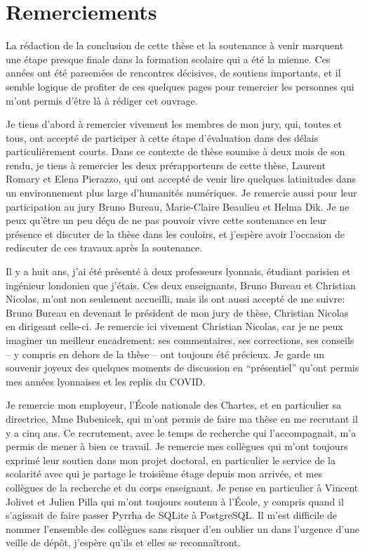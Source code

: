 \chapter*{Remerciements}

La rédaction de la conclusion de cette thèse et la soutenance à venir marquent une étape presque finale dans la formation scolaire qui a été la mienne. Ces années ont été parsemées de rencontres décisives, de soutiens importants, et il semble logique de profiter de ces quelques pages pour remercier les personnes qui m'ont permis d'être là à rédiger cet ouvrage. 

Je tiens d'abord à remercier vivement les membres de mon jury, qui, toutes et tous, ont accepté de participer à cette étape d'évaluation dans des délais particulièrement courts. Dans ce contexte de thèse soumise à deux mois de son rendu, je tiens à remercier les deux prérapporteurs de cette thèse, Laurent Romary et Elena Pierazzo, qui ont accepté de venir lire quelques latinitudes dans un environnement plus large d'humanités numériques. Je remercie aussi pour leur participation au jury Bruno Bureau, Marie-Claire Beaulieu et Helma Dik. Je ne peux qu'être un peu déçu de ne pas pouvoir vivre cette soutenance en leur présence et discuter de la thèse dans les couloirs, et j'espère avoir l'occasion de rediscuter de ces travaux après la soutenance.

Il y a huit ans, j'ai été présenté à deux professeurs lyonnais, étudiant parisien et ingénieur londonien que j'étais. Ces deux enseignants, Bruno Bureau et Christian Nicolas, m'ont non seulement accueilli, mais ils ont aussi accepté de me suivre: Bruno Bureau en devenant le président de mon jury de thèse, Christian Nicolas en dirigeant celle-ci. Je remercie ici vivement Christian Nicolas, car je ne peux imaginer un meilleur encadrement: ses commentaires, ses corrections, ses conseils -- y compris en dehors de la thèse -- ont toujours été précieux. Je garde un souvenir joyeux des quelques moments de discussion en \enquote{présentiel} qu'ont permis mes années lyonnaises et les replis du COVID. 

Je remercie mon employeur, l'École nationale des Chartes, et en particulier sa directrice, Mme Bubenicek, qui m'ont permis de faire ma thèse en me recrutant il y a cinq ans. Ce recrutement, avec le temps de recherche qui l'accompagnait, m'a permis de mener à bien ce travail. Je remercie mes collègues qui m'ont toujours exprimé leur soutien dans mon projet doctoral, en particulier le service de la scolarité avec qui je partage le troisième étage depuis mon arrivée, et mes collègues de la recherche et du corps enseignant. Je pense en particulier à Vincent Jolivet et Julien Pilla qui m'ont toujours soutenu à l'École, y compris quand il s'agissait de faire passer Pyrrha de SQLite à PostgreSQL. Il m'est difficile de nommer l'ensemble des collègues sans risquer d'en oublier un dans l'urgence d'une veille de dépôt, j'espère qu'ils et elles se reconnaîtront. 

